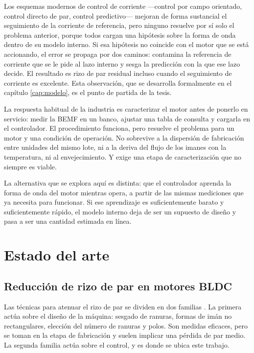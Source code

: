 \documentclass[../../../Tesis_JALS_Maestria.tex]{subfiles}
\begin{document}
Los esquemas modernos de control de corriente ---control por campo orientado, control directo de par, control predictivo--- mejoran de forma sustancial el seguimiento de la corriente de referencia, pero ninguno resuelve por sí solo el problema anterior, porque todos cargan una hipótesis sobre la forma de onda dentro de su modelo interno. Si esa hipótesis no coincide con el motor que se está accionando, el error se propaga por dos caminos: contamina la referencia de corriente que se le pide al lazo interno y sesga la predicción con la que ese lazo decide. El resultado es rizo de par residual incluso cuando el seguimiento de corriente es excelente. Esta observación, que se desarrolla formalmente en el capítulo \ref{cap:modelo}, es el punto de partida de la tesis.

La respuesta habitual de la industria es caracterizar el motor antes de ponerlo en servicio: medir la BEMF en un banco, ajustar una tabla de consulta y cargarla en el controlador. El procedimiento funciona, pero resuelve el problema para un motor y una condición de operación. No sobrevive a la dispersión de fabricación entre unidades del mismo lote, ni a la deriva del flujo de los imanes con la temperatura, ni al envejecimiento. Y exige una etapa de caracterización que no siempre es viable.

La alternativa que se explora aquí es distinta: que el controlador aprenda la forma de onda del motor mientras opera, a partir de las mismas mediciones que ya necesita para funcionar. Si ese aprendizaje es suficientemente barato y suficientemente rápido, el modelo interno deja de ser un supuesto de diseño y pasa a ser una cantidad estimada en línea.

\section{Estado del arte}
\label{sec:estado-arte}

\subsection{Reducción de rizo de par en motores BLDC}

Las técnicas para atenuar el rizo de par se dividen en dos familias \citep{jahns1996pulsating}. La primera actúa sobre el diseño de la máquina: sesgado de ranuras, formas de imán no rectangulares, elección del número de ranuras y polos. Son medidas eficaces, pero se toman en la etapa de fabricación y suelen implicar una pérdida de par medio. La segunda familia actúa sobre el control, y es donde se ubica este trabajo.
\end{document}
